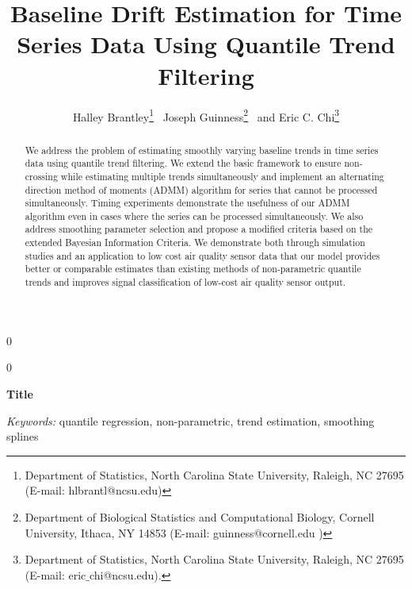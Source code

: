\documentclass[12pt]{article}
\newcommand{\blind}{0}
\begin{document}
	
	
	\def\spacingset#1{\renewcommand{\baselinestretch}%
		{#1}\small\normalsize} \spacingset{1}
	
	
	
	\blind
	{
		\title{\bf Baseline Drift Estimation for Time Series Data Using Quantile Trend Filtering}
		\author{Halley Brantley\thanks{
				Department of Statistics, North Carolina State University, Raleigh, NC 27695 (E-mail: hlbrantl@ncsu.edu)} \,
			Joseph Guinness\thanks{
				Department of Biological Statistics and Computational Biology, Cornell University, Ithaca, NY 14853 (E-mail: guinness@cornell.edu )} \,
			and
			Eric C. Chi\thanks{Department of Statistics, North Carolina State University, Raleigh, NC 27695 (E-mail: eric$\_$chi@ncsu.edu).}    \\}
		\date{}
		\maketitle
	} \fi
		
	\blind
	{
		\bigskip
		\bigskip
		\bigskip
		\begin{center}
			{\LARGE\bf Title}
		\end{center}
		\medskip
	} \fi
	
	\bigskip
	\begin{abstract}
		We address the problem of estimating smoothly varying baseline trends in time series data using quantile trend filtering. We extend the basic framework to ensure non-crossing while estimating multiple trends simultaneously and implement an alternating direction method of moments (ADMM) algorithm for series that cannot be processed simultaneously. Timing experiments demonstrate the usefulness of our ADMM algorithm even in cases where the series can be processed simultaneously. We also address smoothing parameter selection and propose a modified criteria based on the extended Bayesian Information Criteria. We demonstrate both through simulation studies and an application to low cost air quality sensor data that our model provides better or comparable estimates than existing methods of non-parametric quantile trends and improves signal classification of low-cost air quality sensor output. 
	\end{abstract}
	
	\noindent%
	{\it Keywords:} quantile regression, non-parametric, trend estimation, smoothing splines
	\vfill
	
\end{document}
